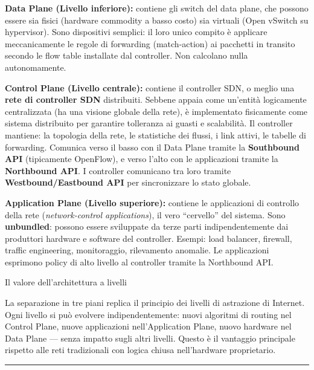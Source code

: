 \documentclass[
  italian,
  openany]{book}
\begin{document}
\textbf{Data Plane (Livello inferiore):} contiene gli switch del data
plane, che possono essere sia fisici (hardware commodity a basso costo)
sia virtuali (Open vSwitch su hypervisor). Sono dispositivi semplici: il
loro unico compito è applicare meccanicamente le regole di forwarding
(match-action) ai pacchetti in transito secondo le flow table installate
dal controller. Non calcolano nulla autonomamente.

\textbf{Control Plane (Livello centrale):} contiene il controller SDN, o
meglio una \textbf{rete di controller SDN} distribuiti. Sebbene appaia
come un'entità logicamente centralizzata (ha una visione globale della
rete), è implementato fisicamente come sistema distribuito per garantire
tolleranza ai guasti e scalabilità. Il controller mantiene: la topologia
della rete, le statistiche dei flussi, i link attivi, le tabelle di
forwarding. Comunica verso il basso con il Data Plane tramite la
\textbf{Southbound API} (tipicamente OpenFlow), e verso l'alto con le
applicazioni tramite la \textbf{Northbound API}. I controller comunicano
tra loro tramite \textbf{Westbound/Eastbound API} per sincronizzare lo
stato globale.

\textbf{Application Plane (Livello superiore):} contiene le applicazioni
di controllo della rete (\emph{network-control applications}), il vero
``cervello'' del sistema. Sono \textbf{unbundled}: possono essere
sviluppate da terze parti indipendentemente dai produttori hardware e
software del controller. Esempi: load balancer, firewall, traffic
engineering, monitoraggio, rilevamento anomalie. Le applicazioni
esprimono policy di alto livello al controller tramite la Northbound
API.

\begin{calloutnote}{Il valore dell’architettura a livelli}

La separazione in tre piani replica il principio dei livelli di
astrazione di Internet. Ogni livello si può evolvere indipendentemente:
nuovi algoritmi di routing nel Control Plane, nuove applicazioni
nell'Application Plane, nuovo hardware nel Data Plane --- senza impatto
sugli altri livelli. Questo è il vantaggio principale rispetto alle reti
tradizionali con logica chiusa nell'hardware proprietario.

\end{calloutnote}

\begin{center}\rule{0.5\linewidth}{0.5pt}\end{center}
\end{document}

